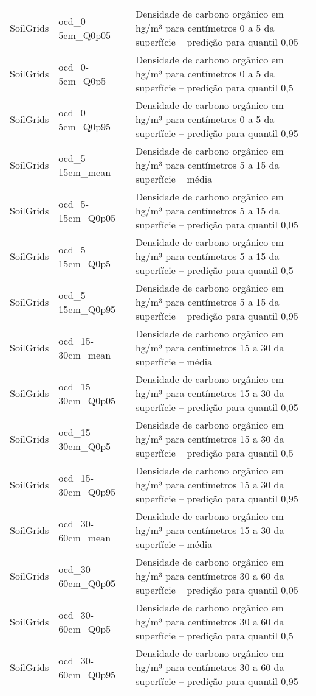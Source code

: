\begin{longtable}{@{} p{4cm} p{4cm} p{8cm} @{}}
	SoilGrids &
	ocd\_0-5cm\_Q0p05 &
	Densidade de carbono orgânico em hg/m³ para centímetros 0 a 5 da superfície – predição para quantil 0,05 \\
	SoilGrids &
	ocd\_0-5cm\_Q0p5 &
	Densidade de carbono orgânico em hg/m³ para centímetros 0 a 5 da superfície – predição para quantil 0,5 \\
	SoilGrids &
	ocd\_0-5cm\_Q0p95 &
	Densidade de carbono orgânico em hg/m³ para centímetros 0 a 5 da superfície – predição para quantil 0,95 \\
	SoilGrids &
	ocd\_5-15cm\_mean &
	Densidade de carbono orgânico em hg/m³ para centímetros 5 a 15 da superfície – média \\
	SoilGrids &
	ocd\_5-15cm\_Q0p05 &
	Densidade de carbono orgânico em hg/m³ para centímetros 5 a 15 da superfície – predição para quantil 0,05 \\
	SoilGrids &
	ocd\_5-15cm\_Q0p5 &
	Densidade de carbono orgânico em hg/m³ para centímetros 5 a 15 da superfície – predição para quantil 0,5 \\
	SoilGrids &
	ocd\_5-15cm\_Q0p95 &
	Densidade de carbono orgânico em hg/m³ para centímetros 5 a 15 da superfície – predição para quantil 0,95 \\
	SoilGrids &
	ocd\_15-30cm\_mean &
	Densidade de carbono orgânico em hg/m³ para centímetros 15 a 30 da superfície – média \\
	SoilGrids &
	ocd\_15-30cm\_Q0p05 &
	Densidade de carbono orgânico em hg/m³ para centímetros 15 a 30 da superfície – predição para quantil 0,05 \\
	SoilGrids &
	ocd\_15-30cm\_Q0p5 &
	Densidade de carbono orgânico em hg/m³ para centímetros 15 a 30 da superfície – predição para quantil 0,5 \\
	SoilGrids &
	ocd\_15-30cm\_Q0p95 &
	Densidade de carbono orgânico em hg/m³ para centímetros 15 a 30 da superfície – predição para quantil 0,95 \\
	SoilGrids &
	ocd\_30-60cm\_mean &
	Densidade de carbono orgânico em hg/m³ para centímetros 15 a 30 da superfície – média \\
	SoilGrids &
	ocd\_30-60cm\_Q0p05 &
	Densidade de carbono orgânico em hg/m³ para centímetros 30 a 60 da superfície – predição para quantil 0,05 \\
	SoilGrids &
	ocd\_30-60cm\_Q0p5 &
	Densidade de carbono orgânico em hg/m³ para centímetros 30 a 60 da superfície – predição para quantil 0,5 \\
	SoilGrids &
	ocd\_30-60cm\_Q0p95 &
	Densidade de carbono orgânico em hg/m³ para centímetros 30 a 60 da superfície – predição para quantil 0,95 \\

\end{longtable}
